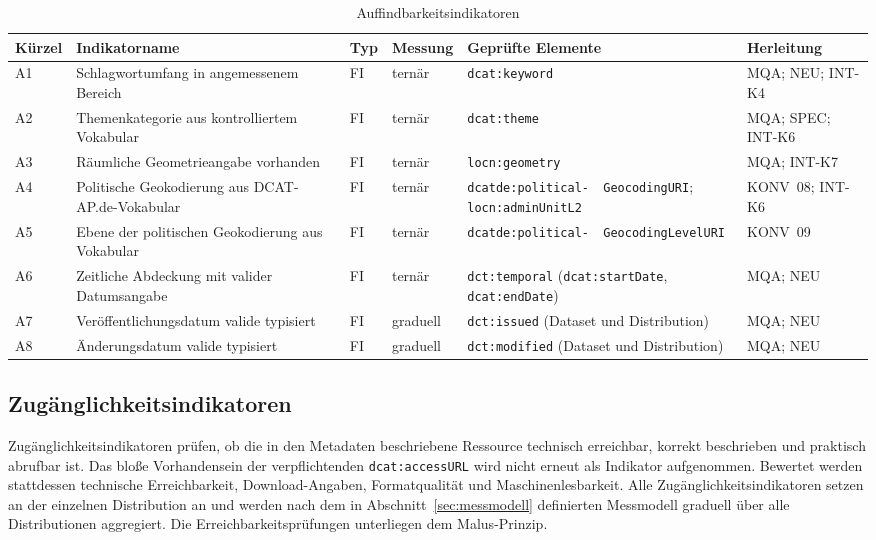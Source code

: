 \begin{table}[H]
\centering
\scriptsize
\renewcommand{\arraystretch}{1.2}
\begin{tabular}{p{} p{} p{} p{} p{} >{\raggedright\arraybackslash}p{}}
    \hline
    \textbf{Kürzel} & \textbf{Indikatorname} & \textbf{Typ} & \textbf{Messung} & \textbf{Geprüfte Elemente} & \textbf{Herleitung} \\
    \hline
    A1 & Schlagwortumfang in angemessenem Bereich & FI & ternär & \texttt{dcat:keyword} & MQA; NEU; INT-K4 \\
    \hline
    A2 & Themenkategorie aus kontrolliertem Vokabular & FI & ternär & \texttt{dcat:theme} & MQA; SPEC; INT-K6 \\
    \hline
    A3 & Räumliche Geometrieangabe vorhanden & FI & ternär & \texttt{locn:geometry} & MQA; INT-K7 \\
    \hline
    A4 & Politische Geokodierung aus DCAT-AP.de-Vokabular & FI & ternär & \texttt{dcatde:political- \ GeocodingURI}; \texttt{locn:adminUnitL2} & KONV~08; INT-K6 \\
    \hline
    A5 & Ebene der politischen Geokodierung aus Vokabular & FI & ternär & \texttt{dcatde:political- \ GeocodingLevelURI} & KONV~09 \\
    \hline
    A6 & Zeitliche Abdeckung mit valider Datumsangabe & FI & ternär & \texttt{dct:temporal} (\texttt{dcat:startDate}, \texttt{dcat:endDate}) & MQA; NEU \\
    \hline
    A7 & Veröffentlichungsdatum valide typisiert & FI & graduell & \texttt{dct:issued} (Dataset und Distribution) & MQA; NEU \\
    \hline
    A8 & Änderungsdatum valide typisiert & FI & graduell & \texttt{dct:modified} (Dataset und Distribution) & MQA; NEU \\
    \hline
\end{tabular}
\caption{Auffindbarkeitsindikatoren}
\label{tab:auffindbarkeitsindikatoren}
\end{table}

\subsection{Zugänglichkeitsindikatoren}

Zugänglichkeitsindikatoren prüfen, ob die in den Metadaten beschriebene Ressource technisch erreichbar, korrekt beschrieben und praktisch abrufbar ist. Das bloße Vorhandensein der verpflichtenden \texttt{dcat:accessURL} wird nicht erneut als Indikator aufgenommen. Bewertet werden stattdessen technische Erreichbarkeit, Download-Angaben, Formatqualität und Maschinenlesbarkeit. Alle Zugänglichkeitsindikatoren setzen an der einzelnen Distribution an und werden nach dem in Abschnitt~\ref{sec:messmodell} definierten Messmodell graduell über alle Distributionen aggregiert. Die Erreichbarkeitsprüfungen unterliegen dem Malus-Prinzip.

